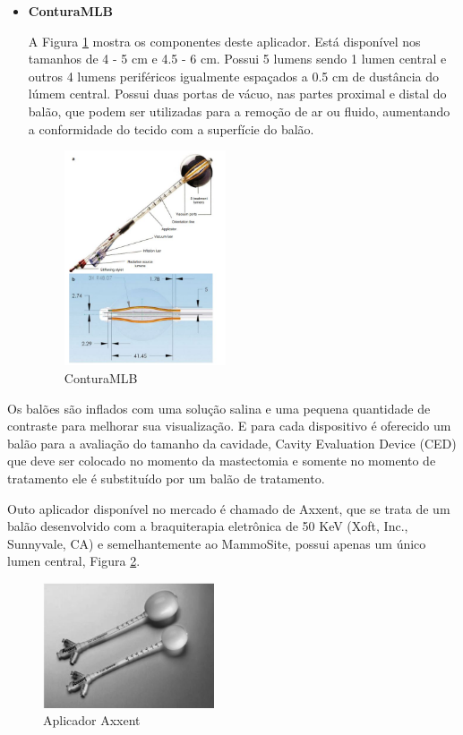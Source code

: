 \documentclass[11pt,a4paper]{article}
\begin{document}
\begin{itemize}
				
				\item \textbf{\textcolor{CarnationPink}{ConturaMLB}}
					
					A Figura \ref{img:conturaMLB} mostra os componentes deste aplicador. Está disponível nos tamanhos de 4 - 5 cm e 4.5 - 6 cm. Possui 5 lumens sendo 1 lumen central e outros 4 lumens periféricos igualmente espaçados a 0.5 cm de dustância do lúmem central. Possui duas portas de vácuo, nas partes proximal e distal do balão, que podem ser utilizadas para a remoção de ar ou fluido, aumentando a conformidade do tecido com a superfície do balão.
					
					\begin{figure}[h]
						\centering
						\includegraphics[width=0.45\textwidth]{Imagens/conturaMLB.JPG}
						\caption{ConturaMLB}
						\label{img:conturaMLB}
					\end{figure}
				\end{itemize}
			
			Os balões são inflados com uma solução salina e uma pequena quantidade de contraste para melhorar sua visualização. E para cada dispositivo é oferecido um balão para a avaliação do tamanho da cavidade, \textcolor{CarnationPink}{Cavity Evaluation Device (CED)} que deve ser colocado no momento da mastectomia e somente no momento de tratamento ele é substituído por um balão de tratamento.

			Outo aplicador disponível no mercado é chamado de \textcolor{CarnationPink}{Axxent}, que se trata de um balão desenvolvido com a braquiterapia eletrônica de 50 KeV (Xoft, Inc., Sunnyvale, CA) e semelhantemente ao MammoSite, possui apenas um único lumen central, Figura \ref{img:axxent}.

			\begin{figure}[h]
				\centering
				\includegraphics[width=0.45\textwidth]{Imagens/axxent.JPG}
				\caption{Aplicador Axxent}
				\label{img:axxent}
			\end{figure}

		









	
\end{document}
